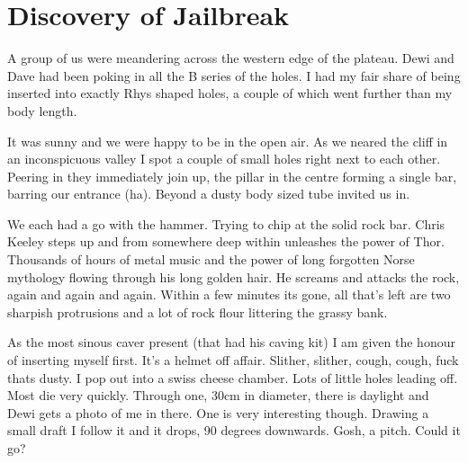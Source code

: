 \begin{marginfigure}
\end{marginfigure}

\section{Discovery of Jailbreak}
 
A group of us were meandering across the western edge of the plateau. Dewi and Dave had been poking in all the B series of the holes. I had my fair share of being inserted into exactly Rhys shaped holes, a couple of which went further than my body length.
 
It was sunny and we were happy to be in the open air. As we neared the cliff in an inconspicuous valley I spot a couple of small holes right next to each other. Peering in they immediately join up, the pillar in the centre forming a single bar, barring our entrance (ha). Beyond a dusty body sized tube invited us in. 

We each had a go with the hammer. Trying to chip at the solid rock bar. Chris Keeley steps up and from somewhere deep within unleashes the power of Thor. Thousands of hours of metal music and the power of long forgotten Norse mythology flowing through his long golden hair. He screams and attacks the rock, again and again and again. Within a few minutes its gone, all that's left are two sharpish protrusions and a lot of rock flour littering the grassy bank. 
 
As the most sinous caver present (that had his caving kit) I am given the honour of inserting myself first. It's a helmet off affair. Slither, slither, cough, cough, fuck thats dusty. I pop out into a swiss cheese chamber. Lots of little holes leading off. Most die very quickly. Through one, 30cm in diameter, there is daylight and Dewi gets a photo of me in there. One is very interesting though. Drawing a small draft I follow it and it drops, 90 degrees downwards. Gosh, a pitch. Could it go?
 
